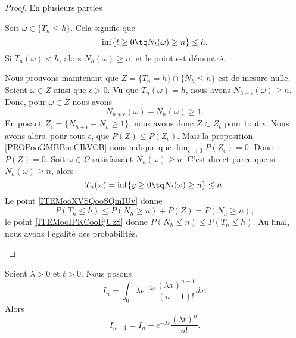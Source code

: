 \begin{proof}
	En plusieurs parties
	\begin{subproof}
		Soit \( \omega\in\{ T_n\leq h \}\). Cela signifie que
		\begin{equation}
			\inf\{ t\geq 0\tq N_t(\omega)\geq n \}\leq h.
		\end{equation}
		Si \( T_n(\omega)<h\), alors \( N_h(\omega)\geq n\), et le point est démontré.

		Nous prouvons maintenant que \(  Z=\{ T_n=h \}\cap \{ N_h\leq n \}\) est de mesure nulle. Soient \( \omega\in Z\) ainsi que \( \epsilon>0\). Vu que \( T_n(\omega)=h\), nous avons \( N_{h+\epsilon}(\omega)\geq n\). Donc, pour \( \omega\in Z\) nous avons
		\begin{equation}
			N_{h+\epsilon}(\omega)-N_h(\omega)\geq 1.
		\end{equation}
		En posant \( Z_{\epsilon}=\{ N_{h+\epsilon}-N_h\geq 1 \}\), nous avons donc \( Z\subset Z_{\epsilon}\) pour tout \( \epsilon\). Nous avons alors, pour tout \( \epsilon\), que \( P(Z)\leq P(Z_{\epsilon})\). Mais la proposition \ref{PROPooGMBBooCIkVCB} nous indique que \( \lim_{\epsilon\to 0}P(Z_{\epsilon})=0\). Donc \( P(Z)=0\).
		Soit \( \omega\in \Omega\) satisfaisant \( N_h(\omega)\geq n\). C'est direct parce que si \( N_h(\omega)\geq n\), alors
		\begin{equation}
			T_n(\omega)=\inf\{ y\geq 0\tq N_t(\omega)\geq n \}\leq h.
		\end{equation}
		Le point \ref{ITEMooXVSQooSQmIUv} donne
		\begin{equation}
			P(T_n\leq h)\leq P(N_h\geq n)+P(Z)=P(N_h\geq n),
		\end{equation}
		le point \ref{ITEMooIPKCooIfjUzS} donne \( P(N_h\leq n)\leq P(T_n\leq h)\). Au final, nous avons l'égalité des probabilités.
	\end{subproof}
\end{proof}

\begin{lemma}     \label{LEMooJHMTooQWvOaI}
	Soient \( \lambda>0\) et \( t>0\). Nous posons
	\begin{equation}
		I_n=\int_0^t\lambda e^{-\lambda x}\frac{ (\lambda x)^{n-1} }{ (n-1)! }dx.
	\end{equation}
	Alors
	\begin{equation}
		I_{n+1}=I_n- e^{-\lambda t}\frac{ (\lambda t)^n }{ n! }.
	\end{equation}
\end{lemma}

